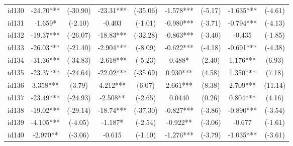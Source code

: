 \documentclass[entropy,article,submit,moreauthors,LaTeX and dvi2pdf]{Definitions/mdpi}
\begin{document}
\begin{center}
\begin{longtable}{ccccccccc}
id130                                         & -24.70***     & (-30.90)      & -23.31***       & (-35.06)         & -1.578***         & (-5.17)           & -1.635***         & (-4.61)           \\
id131                                         & -1.659*       & (-2.10)       & -0.403          & (-1.01)          & -0.980***         & (-3.71)           & -0.794***         & (-4.13)           \\
id132                                         & -19.37***     & (-26.07)      & -18.83***       & (-32.28)         & -0.863***         & (-3.40)           & -0.435            & (-1.85)           \\
id133                                         & -26.03***     & (-21.40)      & -2.904***       & (-8.09)          & -0.622***         & (-4.18)           & -0.691***         & (-4.38)           \\
id134                                         & -31.36***     & (-34.83)      & -2.618***       & (-5.23)          & 0.488*            & (2.40)            & 1.176***          & (6.93)            \\
id135                                         & -23.37***     & (-24.64)      & -22.02***       & (-35.69)         & 0.930***          & (4.58)            & 1.350***          & (7.18)            \\
id136                                         & 3.358***      & (3.79)        & 4.212***        & (6.07)           & 2.661***          & (8.38)            & 2.709***          & (11.14)           \\
id137                                         & -23.49***     & (-24.93)      & -2.508**        & (-2.65)          & 0.0440            & (0.26)            & 0.804***          & (4.16)            \\
id138                                         & -19.02***     & (-29.14)      & -18.74***       & (-37.30)         & -0.827***         & (-3.86)           & -0.890***         & (-3.54)           \\
id139                                         & -4.105***     & (-4.05)       & -1.187*         & (-2.54)          & -0.922**          & (-3.06)           & -0.677            & (-1.61)           \\
id140                                         & -2.970**      & (-3.06)       & -0.615          & (-1.10)          & -1.276***         & (-3.79)           & -1.035***         & (-3.61)           \\

\end{longtable}
\end{center}
\end{document}
